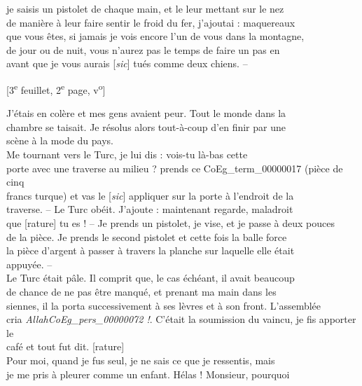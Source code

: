 \documentclass{book}
\begin{document}
je saisis un pistolet de chaque main, et le leur mettant sur le nez\\
de manière à leur faire sentir le froid du fer, j’ajoutai : maquereaux\\
que vous êtes, si jamais je vois encore l’un de vous dans la montagne,\\
de jour ou de nuit, vous n’aurez pas le temps de faire un pas en\\
avant que je vous aurais {[\textit{sic}]} tués comme deux chiens. –
{\footnotesize\begin{center} {[3\textsuperscript{e} feuillet, 2\textsuperscript{e} page, v\textsuperscript{o}]}\end{center}}
\indent J’étais en colère et mes gens avaient peur. Tout le monde dans la\\
chambre se taisait. Je résolus alors tout-à-coup d’en finir par une\\
scène à la mode du pays.\\
\indent Me tournant vers le Turc, je lui dis : vois-tu là-bas cette\\
porte avec une traverse au milieu ? prends ce \gls{CoEg_term_00000017} (pièce de cinq\\
francs turque) et vas le {[\textit{sic}]} appliquer sur la porte à l’endroit de la\\
traverse. – Le Turc obéit. J’ajoute : maintenant regarde, maladroit\\
que [rature] tu es ! – Je prends un pistolet, je vise, et je passe à deux pouces\\
de la pièce. Je prends le second pistolet et cette fois la balle force\\
la pièce d’argent à passer à travers la planche sur laquelle elle était\\
appuyée. –\\
\indent Le Turc était pâle. Il comprit que, le cas échéant, il avait beaucoup\\
de chance de ne pas être manqué, et prenant ma main dans les\\
siennes, il la porta successivement à ses lèvres et à son front. L’assemblée\\
cria \textit{Allah\gls{CoEg_pers_00000072} !}. C’était la soumission du vaincu, je fis apporter le\\
café et tout fut dit. [rature]\\
\indent Pour moi, quand je fus seul, je ne sais ce que je ressentis, mais\\
je me pris à pleurer comme un enfant. Hélas ! Monsieur, pourquoi\\
\end{document}
